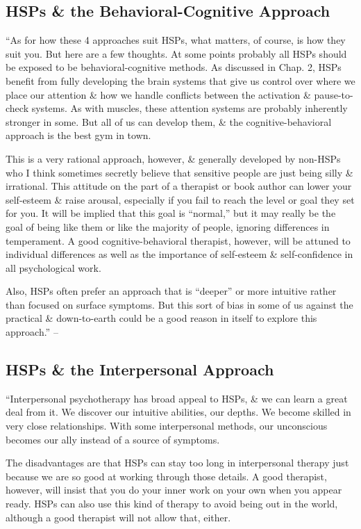 \documentclass{article}
\numberwithin{equation}{section}
\begin{document}
\subsection{HSPs \& the Behavioral-Cognitive Approach}
``As for how these 4 approaches suit HSPs, what matters, of course, is how they suit you. But here are a few thoughts. At some points probably all HSPs should be exposed to be behavioral-cognitive methods. As discussed in Chap. 2, HSPs benefit from fully developing the brain systems that give us control over where we place our attention \& how we handle conflicts between the activation \& pause-to-check systems. As with muscles, these attention systems are probably inherently stronger in some. But all of us can develop them, \& the cognitive-behavioral approach is the best gym in town.

This is a very rational approach, however, \& generally developed by non-HSPs who I think sometimes secretly believe that sensitive people are just being silly \& irrational. This attitude on the part of a therapist or book author can lower your self-esteem \& raise arousal, especially if you fail to reach the level or goal they set for you. It will be implied that this goal is ``normal,'' but it may really be the goal of being like them or like the majority of people, ignoring differences in temperament. A good cognitive-behavioral therapist, however, will be attuned to individual differences as well as the importance of self-esteem \& self-confidence in all psychological work.

Also, HSPs often prefer an approach that is ``deeper'' or more intuitive rather than focused on surface symptoms. But this sort of bias in some of us against the practical \& down-to-earth could be a good reason in itself to explore this approach.'' -- \cite[pp. 208--209]{Aron2013}

\subsection{HSPs \& the Interpersonal Approach}
``Interpersonal psychotherapy has broad appeal to HSPs, \& we can learn a great deal from it. We discover our intuitive abilities, our depths. We become skilled in very close relationships. With some interpersonal methods, our unconscious becomes our ally instead of a source of symptoms.

The disadvantages are that HSPs can stay too long in interpersonal therapy just because we are so good at working through those details. A good therapist, however, will insist that you do your inner work on your own when you appear ready. HSPs can also use this kind of therapy to avoid being out in the world, although a good therapist will not allow that, either.
\end{document}
